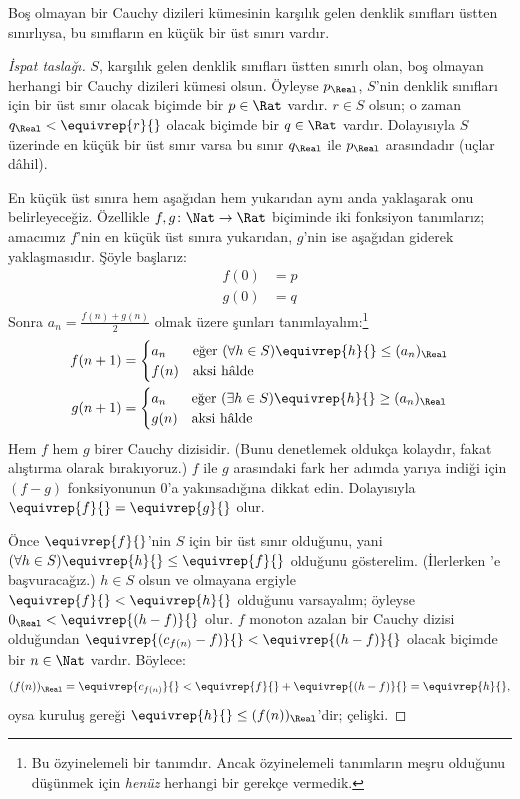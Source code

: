 \documentclass[../../../include/open-logic-section]{subfiles}
\begin{document}
\begin{thm}
Boş olmayan bir Cauchy dizileri kümesinin karşılık gelen denklik sınıfları
üstten sınırlıysa, bu sınıfların en küçük bir üst sınırı vardır.
\end{thm}

\begin{proof}[İspat taslağı]
$S$, karşılık gelen denklik sınıfları üstten sınırlı olan, boş olmayan
herhangi bir Cauchy dizileri kümesi olsun. Öyleyse $p_{\Real}$, $S$'nin
denklik sınıfları için bir üst sınır olacak biçimde bir $p \in \Rat$ vardır.
$r \in S$ olsun; o zaman $q_{\Real} < \equivrep{r}{}$ olacak biçimde bir
$q \in \Rat$ vardır. Dolayısıyla $S$ üzerinde en küçük bir üst sınır varsa
bu sınır $q_\Real$ ile $p_\Real$ arasındadır (uçlar dâhil).

En küçük üst sınıra hem aşağıdan hem yukarıdan aynı anda yaklaşarak onu
belirleyeceğiz. Özellikle $f, g \colon \Nat \to \Rat$ biçiminde iki fonksiyon
tanımlarız; amacımız $f$'nin en küçük üst sınıra yukarıdan, $g$'nin ise
aşağıdan giderek yaklaşmasıdır. Şöyle başlarız:
\begin{align*}
	f(0) &= p \\
	g(0) &= q
\end{align*}
Sonra $a_n = \frac{f(n) + g(n)}{2}$ olmak üzere şunları
tanımlayalım:\footnote{Bu özyinelemeli bir tanımdır. Ancak özyinelemeli
tanımların meşru olduğunu düşünmek için \emph{henüz} herhangi bir gerekçe
vermedik.}
\begin{align*}
	f(n+1) &=
	\begin{cases}
		a_n &\text{eğer }(\forall h \in S)\equivrep{h}{} \leq (a_n)_\Real\\
		f(n)&\text{aksi hâlde}
	\end{cases}\\
	g(n+1) &=
	\begin{cases}
		a_n &\text{eğer }(\exists h \in S)\equivrep{h}{} \geq (a_n)_\Real\\
	 	g(n) &\text{aksi hâlde}
	\end{cases}
\end{align*}
Hem $f$ hem $g$ birer Cauchy dizisidir. (Bunu denetlemek oldukça kolaydır,
fakat alıştırma olarak bırakıyoruz.) $f$ ile $g$ arasındaki fark her adımda
yarıya indiği için $(f-g)$ fonksiyonunun $0$'a yakınsadığına dikkat edin.
Dolayısıyla $\equivrep{f}{} = \equivrep{g}{}$ olur.

Önce $\equivrep{f}{}$'nin $S$ için bir üst sınır olduğunu, yani
$(\forall h \in S)\equivrep{h}{} \leq \equivrep{f}{}$ olduğunu gösterelim.
(İlerlerken 'e başvuracağız.) $h \in S$ olsun ve
olmayana ergiyle $\equivrep{f}{} < \equivrep{h}{}$ olduğunu varsayalım;
öyleyse $0_\Real < \equivrep{(h-f)}{}$ olur. $f$ monoton azalan bir Cauchy
dizisi olduğundan
$\equivrep{(c_{f(n)} - f)}{} < \equivrep{(h-f)}{}$ olacak biçimde bir
$n \in \Nat$ vardır. Böylece:
\[
	(f(n))_\Real = \equivrep{c_{f(n)}}{} < \equivrep{f}{} + \equivrep{(h-f)}{} = \equivrep{h}{},
\]
oysa kuruluş gereği $\equivrep{h}{} \leq (f(n))_\Real$'dir; çelişki.


\end{proof}
\end{document}
